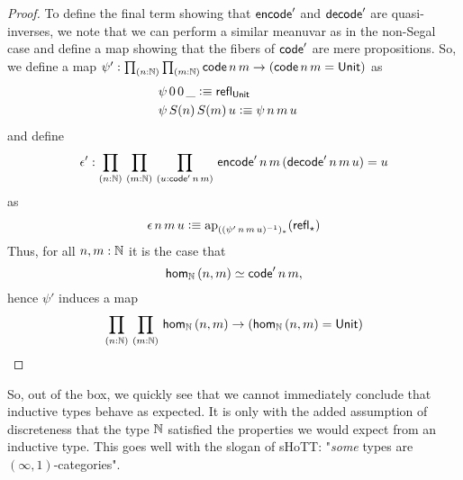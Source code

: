 \documentclass[main.tex]{subfiles}
\begin{document}
\begin{proof}
    To define the final term showing that $\eco'$ and $\dco'$ are quasi-inverses, we note that we can perform a similar
    meanuvar as in the non-Segal case and define a map showing that the fibers of $\co'$ are mere propositions. So, we define a map
     $\psi' : \prd{n : \N}{m : \N}\co\,n\,m \to (\co\,n\,m = \Un)$ as
    \begin{align*}
        &\psi\,0\,0\,\_\defeq \refl{\Un}\\
        &\psi\,S(n)\,S(m)\,u\defeq\psi\,n\,m\,u&
    \end{align*}
    and define 
$$\epsilon' : \prd{n:\N}{m:\N}{u : \co' \, n\, m}\eco'\,n\,m\,(\dco'\,n\,m \,u) =u$$
as
\begin{align*}
    \epsilon\,n\,m\,u \defeq \text{ap}_{((\psi'\,n\,m\,u)^{-1})_*}(\refl{\star})
\end{align*}
    Thus, for all $n,m : \N$ it is the case that
    $$\ho[\N]{n}{m}\simeq \co'\,n\,m,$$ hence $\psi'$ induces a map
    $$\prd{n : \N}{m : \N}\ho[\N]{n}{m} \to (\ho[\N]{n}{m} = \Un)$$
\end{proof}

So, out of the box, we quickly see that we cannot immediately conclude that inductive types behave as expected. It is only with
the added assumption of discreteness that the type $\N$ satisfied the properties we would expect from an inductive type.
This goes well with the slogan of sHoTT: "\textit{some} types are $(\infty,1)$-categories". 
\end{document}
